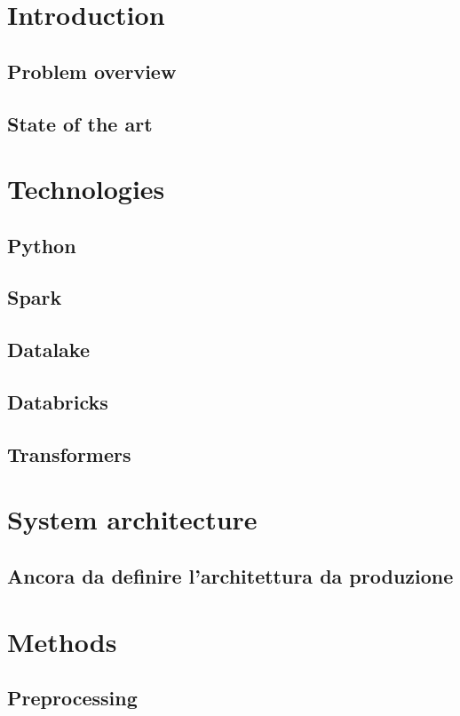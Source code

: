 \documentclass{oist}
\begin{document}




\tableofcontents
{}

\chapter{Introduction}
\section{Problem overview}
\section{State of the art}

\chapter{Technologies}
\section{Python}
\section{Spark}
\section{Datalake}
\section{Databricks}
\section{Transformers}

\chapter{System architecture}
\section{Ancora da definire l'architettura da produzione}

\chapter{Methods}
\section{Preprocessing}
\end{document}
